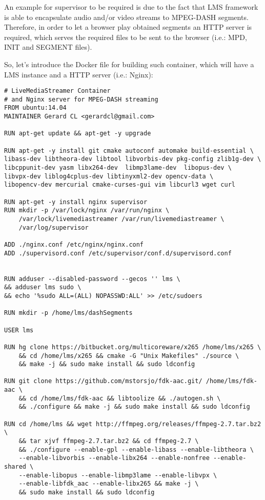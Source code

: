 An example for supervisor to be required is due to the fact that LMS framework is able to encapsulate audio and/or video streams to MPEG-DASH segments. Therefore, in order to let a browser play obtained segments an HTTP server is required, which serves the required files to be sent to the browser (i.e.: MPD, INIT and SEGMENT files).

So, let's introduce the Docker file for building such container, which will have a LMS instance and a HTTP server (i.e.: Nginx):
\begin{verbatim}
# LiveMediaStreamer Container
# and Nginx server for MPEG-DASH streaming
FROM ubuntu:14.04
MAINTAINER Gerard CL <gerardcl@gmail.com>

RUN apt-get update && apt-get -y upgrade

RUN apt-get -y install git cmake autoconf automake build-essential \ 
libass-dev libtheora-dev libtool libvorbis-dev pkg-config zlib1g-dev \
libcppunit-dev yasm libx264-dev  libmp3lame-dev  libopus-dev \
libvpx-dev liblog4cplus-dev libtinyxml2-dev opencv-data \
libopencv-dev mercurial cmake-curses-gui vim libcurl3 wget curl 

RUN apt-get -y install nginx supervisor
RUN mkdir -p /var/lock/nginx /var/run/nginx \
	/var/lock/livemediastreamer /var/run/livemediastreamer \
	/var/log/supervisor

ADD ./nginx.conf /etc/nginx/nginx.conf
ADD ./supervisord.conf /etc/supervisor/conf.d/supervisord.conf


RUN adduser --disabled-password --gecos '' lms \
&& adduser lms sudo \
&& echo '%sudo ALL=(ALL) NOPASSWD:ALL' >> /etc/sudoers

RUN mkdir -p /home/lms/dashSegments

USER lms

RUN hg clone https://bitbucket.org/multicoreware/x265 /home/lms/x265 \
	&& cd /home/lms/x265 && cmake -G "Unix Makefiles" ./source \
	&& make -j && sudo make install && sudo ldconfig

RUN git clone https://github.com/mstorsjo/fdk-aac.git/ /home/lms/fdk-aac \
	&& cd /home/lms/fdk-aac && libtoolize && ./autogen.sh \
	&& ./configure && make -j && sudo make install && sudo ldconfig

RUN cd /home/lms && wget http://ffmpeg.org/releases/ffmpeg-2.7.tar.bz2 \
	&& tar xjvf ffmpeg-2.7.tar.bz2 && cd ffmpeg-2.7 \
	&& ./configure --enable-gpl --enable-libass --enable-libtheora \
	--enable-libvorbis --enable-libx264 --enable-nonfree --enable-shared \
	--enable-libopus --enable-libmp3lame --enable-libvpx \
	--enable-libfdk_aac --enable-libx265 && make -j \
	&& sudo make install && sudo ldconfig


\end{verbatim}
